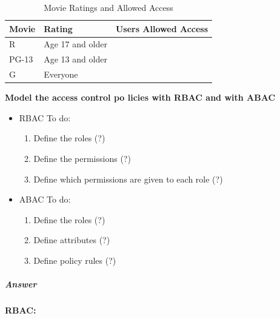 \documentclass{article}
\begin{document}
                \begin{table}[h]
                    \centering
                    \begin{tabular}{|>{\centering\arraybackslash}m{1.5cm}|>{\centering\arraybackslash}m{4cm}|>{\centering\arraybackslash}m{5cm}|}
                    \hline
                    \textbf{Movie} & \textbf{Rating} & \textbf{Users Allowed Access} \\ \hline
                    R & Age 17 and older & \\ \hline
                    PG-13 & Age 13 and older & \\ \hline
                    G & Everyone & \\ \hline
                    \end{tabular}
                    \caption{Movie Ratings and Allowed Access}
                \end{table}
                
                    \textbf{Model the access control po
                    licies
                    with RBAC and with ABAC}
                \begin{itemize}
              
                    \item RBAC To do:
                    \begin{enumerate}
                        \item Define the roles (?)
                        \item Define the permissions (?)
                        \item Define which permissions are given to each role (?)
                    \end{enumerate}

                    \item ABAC To do:
                    \begin{enumerate}
                        \item Define the roles (?)
                        \item Define attributes (?)
                        \item Define policy rules (?)
                    \end{enumerate}

                        \end{itemize}

                \subparagraph{Answer}
                        \textbf{RBAC:}
\end{document}
